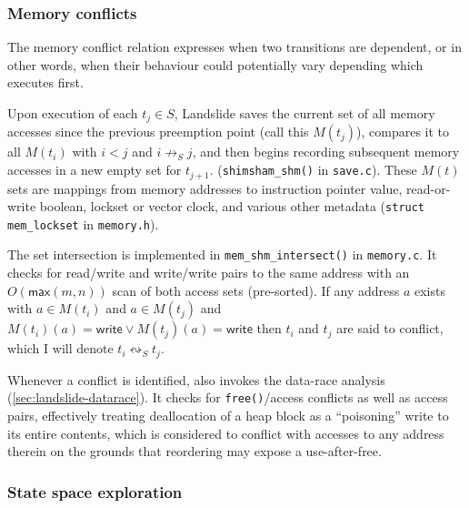 \subsubsection{Memory conflicts}
\label{sec:landslide-dpor-conflix}

The memory conflict relation expresses when two transitions are dependent,
or in other words, when their behaviour could potentially vary depending which executes first.

Upon execution of each $t_j \in S$,
Landslide saves the current set of all memory accesses since the previous preemption point (call this $M(t_j)$),
compares it to all $M(t_i)$ with $i < j$ and $i \not\rightarrow_S j$,
and then begins recording subsequent memory accesses in a new empty set for $t_{j+1}$.
({\tt shimsham\_shm()} in {\tt save.c}).
These $M(t)$ sets are mappings from memory addresses to
instruction pointer value, read-or-write boolean, lockset or vector clock, and various other metadata
({\tt struct mem\_lockset} in {\tt memory.h}).

The set intersection is implemented in {\tt mem\_shm\_intersect()} in {\tt memory.c}.
It checks for read/write and write/write pairs to the same address with an $O(\mathsf{max}(m,n))$ scan of both access sets (pre-sorted).
If any address $a$ exists with $a \in M(t_i)$ and $a \in M(t_j)$ and $M(t_i)(a) = \mathsf{write} \vee M(t_j)(a) = \mathsf{write}$
then $t_i$ and $t_j$ are said to conflict,
which I will denote $t_i \leftrightsquigarrow_S t_j$.

Whenever a conflict is identified,
 also invokes the data-race analysis (\cref{sec:landslide-datarace}).
It checks for {\tt free()}/access conflicts as well as access pairs,
effectively treating deallocation of a heap block as a ``poisoning'' write to its entire contents,
which is considered to conflict with accesses to any address therein
on the grounds that reordering may expose a use-after-free.

\subsubsection{State space exploration}
\label{sec:landslide-explore}

